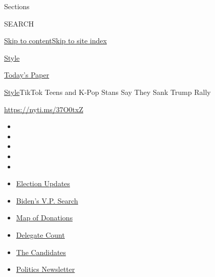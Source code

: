 Sections

SEARCH

\protect\hyperlink{site-content}{Skip to
content}\protect\hyperlink{site-index}{Skip to site index}

\href{https://www.nytimes3xbfgragh.onion/section/style}{Style}

\href{https://myaccount.nytimes3xbfgragh.onion/auth/login?response_type=cookie\&client_id=vi}{}

\href{https://www.nytimes3xbfgragh.onion/section/todayspaper}{Today's
Paper}

\href{/section/style}{Style}\textbar{}TikTok Teens and K-Pop Stans Say
They Sank Trump Rally

\url{https://nyti.ms/37O0txZ}

\begin{itemize}
\item
\item
\item
\item
\item
\end{itemize}

\begin{itemize}
\item
  \href{https://www.nytimes3xbfgragh.onion/2020/07/31/us/elections/biden-vs-trump.html?action=click\&pgtype=Article\&state=default\&region=TOP_BANNER\&context=storylines_menu}{Election
  Updates}
\item
  \href{https://www.nytimes3xbfgragh.onion/article/biden-vice-president-2020.html?action=click\&pgtype=Article\&state=default\&region=TOP_BANNER\&context=storylines_menu}{Biden's
  V.P. Search}
\item
  \href{https://www.nytimes3xbfgragh.onion/interactive/2020/07/24/us/politics/trump-biden-campaign-donors.html?action=click\&pgtype=Article\&state=default\&region=TOP_BANNER\&context=storylines_menu}{Map
  of Donations}
\item
  \href{https://www.nytimes3xbfgragh.onion/interactive/2020/us/elections/delegate-count-primary-results.html?action=click\&pgtype=Article\&state=default\&region=TOP_BANNER\&context=storylines_menu}{Delegate
  Count}
\item
  \href{https://www.nytimes3xbfgragh.onion/interactive/2019/us/politics/2020-presidential-candidates.html?action=click\&pgtype=Article\&state=default\&region=TOP_BANNER\&context=storylines_menu}{The
  Candidates}
\item
  \href{https://www.nytimes3xbfgragh.onion/newsletters/politics?action=click\&pgtype=Article\&state=default\&region=TOP_BANNER\&context=storylines_menu}{Politics
  Newsletter}
\end{itemize}

